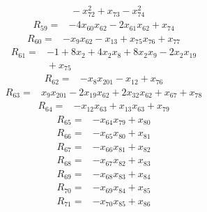 {\begin{align*}
&{}  - x_{72}^{2} + x_{73} - x_{74}^{2}
\end{align*}
\begin{align*}
R_{59} ={}& -4x_{60} x_{62} - 2x_{61} x_{62} + x_{74}
\end{align*}
\begin{align*}
R_{60} ={}& -x_{9} x_{62} - x_{13} + x_{75} x_{76} + x_{77}
\end{align*}
\begin{align*}
R_{61} ={}& -1 + 8x_{2} + 4x_{2} x_{8} + 8x_{2} x_{9} - 2x_{2} x_{19} \\
&{}  + x_{75}
\end{align*}
\begin{align*}
R_{62} ={}& -x_{8} x_{201} - x_{12} + x_{76}
\end{align*}
\begin{align*}
R_{63} ={}& x_{9} x_{201} - 2x_{19} x_{62} + 2x_{32} x_{62} + x_{67} + x_{78}
\end{align*}
\begin{align*}
R_{64} ={}& -x_{12} x_{63} + x_{13} x_{63} + x_{79}
\end{align*}
\begin{align*}
R_{65} ={}& -x_{64} x_{79} + x_{80}
\end{align*}
\begin{align*}
R_{66} ={}& -x_{65} x_{80} + x_{81}
\end{align*}
\begin{align*}
R_{67} ={}& -x_{66} x_{81} + x_{82}
\end{align*}
\begin{align*}
R_{68} ={}& -x_{67} x_{82} + x_{83}
\end{align*}
\begin{align*}
R_{69} ={}& -x_{68} x_{83} + x_{84}
\end{align*}
\begin{align*}
R_{70} ={}& -x_{69} x_{84} + x_{85}
\end{align*}
\begin{align*}
R_{71} ={}& -x_{70} x_{85} + x_{86}

\end{align*}}
